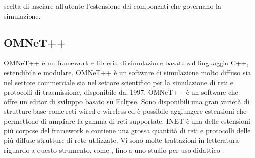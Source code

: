 scelta di lasciare all'utente l'estensione dei componenti che governano la simulazione.
\bigskip

\subsection{OMNeT++}
OMNeT++ è un framework e libreria di simulazione basata sul linguaggio C++, estendibile e modulare. OMNeT++ è un software di simulazione molto diffuso sia nel settore commerciale sia nel settore scientifico per la simulazione di reti e protocolli di trasmissione, disponibile dal 1997. OMNeT++ è un software che offre un editor di sviluppo basato su Eclipse. Sono disponibili una gran varietà di strutture base come reti wired e wireless ed è possibile aggiungere estensioni che permettono di ampliare la gamma di reti supportate. INET è una delle estensioni più corpose del framework e contiene una grossa quantità di reti e protocolli delle più diffuse strutture di rete utilizzate. Vi sono molte trattazioni in letteratura riguardo a questo strumento, come \cite{omnet2010-book}, \cite{omnet2002-overview} fino a uno studio per uso didattico \cite{omnet2002-edu}.

